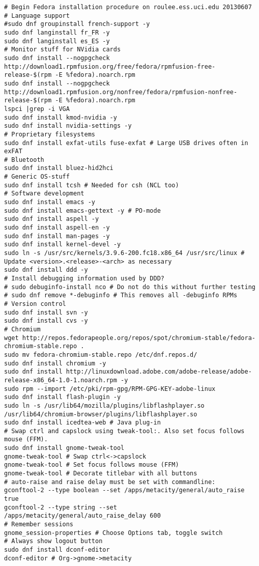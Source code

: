 \documentclass[12pt,twoside]{article}
\begin{document}
\begin{verbatim}
# Begin Fedora installation procedure on roulee.ess.uci.edu 20130607
# Language support
#sudo dnf groupinstall french-support -y
sudo dnf langinstall fr_FR -y
sudo dnf langinstall es_ES -y
# Monitor stuff for NVidia cards
sudo dnf install --nogpgcheck http://download1.rpmfusion.org/free/fedora/rpmfusion-free-release-$(rpm -E %fedora).noarch.rpm
sudo dnf install --nogpgcheck http://download1.rpmfusion.org/nonfree/fedora/rpmfusion-nonfree-release-$(rpm -E %fedora).noarch.rpm
lspci |grep -i VGA
sudo dnf install kmod-nvidia -y
sudo dnf install nvidia-settings -y
# Proprietary filesystems
sudo dnf install exfat-utils fuse-exfat # Large USB drives often in exFAT
# Bluetooth
sudo dnf install bluez-hid2hci
# Generic OS-stuff
sudo dnf install tcsh # Needed for csh (NCL too)
# Software development
sudo dnf install emacs -y
sudo dnf install emacs-gettext -y # PO-mode
sudo dnf install aspell -y
sudo dnf install aspell-en -y
sudo dnf install man-pages -y
sudo dnf install kernel-devel -y
sudo ln -s /usr/src/kernels/3.9.6-200.fc18.x86_64 /usr/src/linux # Update <version>.<release>-<arch> as necessary
sudo dnf install ddd -y
# Install debugging information used by DDD?
# sudo debuginfo-install nco # Do not do this without further testing
# sudo dnf remove *-debuginfo # This removes all -debuginfo RPMs
# Version control
sudo dnf install svn -y
sudo dnf install cvs -y
# Chromium
wget http://repos.fedorapeople.org/repos/spot/chromium-stable/fedora-chromium-stable.repo .
sudo mv fedora-chromium-stable.repo /etc/dnf.repos.d/
sudo dnf install chromium -y
sudo dnf install http://linuxdownload.adobe.com/adobe-release/adobe-release-x86_64-1.0-1.noarch.rpm -y
sudo rpm --import /etc/pki/rpm-gpg/RPM-GPG-KEY-adobe-linux
sudo dnf install flash-plugin -y
sudo ln -s /usr/lib64/mozilla/plugins/libflashplayer.so /usr/lib64/chromium-browser/plugins/libflashplayer.so
sudo dnf install icedtea-web # Java plug-in
# Swap ctrl and capslock using tweak-tool:. Also set focus follows mouse (FFM).
sudo dnf install gnome-tweak-tool
gnome-tweak-tool # Swap ctrl<->capslock
gnome-tweak-tool # Set focus follows mouse (FFM)
gnome-tweak-tool # Decorate titlebar with all buttons
# auto-raise and raise delay must be set with commandline:
gconftool-2 --type boolean --set /apps/metacity/general/auto_raise true
gconftool-2 --type string --set /apps/metacity/general/auto_raise_delay 600
# Remember sessions
gnome_session-properties # Choose Options tab, toggle switch
# Always show logout button
sudo dnf install dconf-editor
dconf-editor # Org->gnome->metacity

\end{verbatim}
\end{document}
